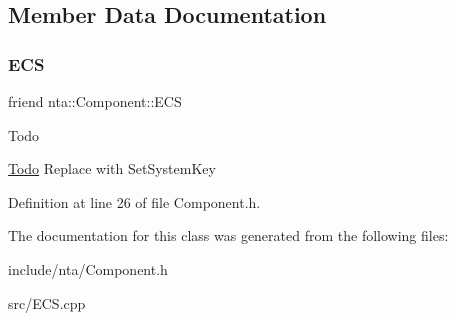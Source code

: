 \subsection{Member Data Documentation}
\mbox{\label{classnta_1_1Component_abed0426a01836855941e0236441eaf76}} 
\subsubsection{\texorpdfstring{E\+CS}{ECS}}
{\footnotesize\ttfamily friend nta\+::\+Component\+::\+E\+CS}

\begin{DoxyRefDesc}{Todo}
\item[\hyperlink{todo__todo000002}{Todo}]Replace with Set\+System\+Key \end{DoxyRefDesc}


Definition at line 26 of file Component.\+h.



The documentation for this class was generated from the following files\+:\begin{DoxyCompactItemize}
\item 
include/nta/Component.\+h\item 
src/E\+C\+S.\+cpp\end{DoxyCompactItemize}
